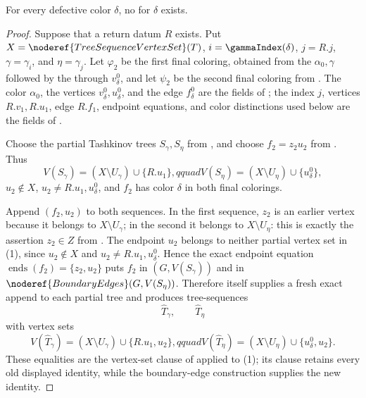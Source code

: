 \begin{helper}
For every defective color $\delta$, no
 for $\delta$ exists.
\end{helper}
\begin{proof}
Suppose that a return datum $R$ exists.  Put
$X=\noderef{TreeSequenceVertexSet}(T)$,
$i=\gammaIndex(\delta)$, $j=R.j$,
$\gamma=\gamma_i$, and $\eta=\gamma_j$.  Let
$\varphi_2$ be the first final coloring, obtained from the
$\alpha _0,\gamma$  followed by the
 through $v^0_\delta$, and let $\psi_2$
be the second final coloring from
.  The color $\alpha _0$,
the vertices $v^0_\delta,u^0_\delta$, and the edge $f^0_\delta$ are the
fields of ; the index $j$, vertices
$R.v_1,R.u_1$, edge $R.f_1$, endpoint equations, and color distinctions
used below are the fields of .

Choose the partial Tashkinov trees $S_\gamma,S_\eta$ from
, and choose
$f_2=z_2u_2$ from .  Thus
\[
 V(S_\gamma)=(X\setminus U_\gamma)\cup\{R.u_1\},qquad
 V(S_\eta)=(X\setminus U_\eta)\cup\{u^0_\delta\},             \tag{1}
\]
$u_2\notin X$, $u_2\ne R.u_1,u^0_\delta$, and $f_2$ has color
$\delta$ in both final colorings.

Append $(f_2,u_2)$ to both sequences.  In the first sequence, $z_2$ is
an earlier vertex because it belongs to
$X\setminus U_\gamma$; in the second it belongs to
$X\setminus U_\eta$: this is exactly the assertion $z_2\in Z$ from
.  The endpoint $u_2$ belongs
to neither partial vertex set in (1), since $u_2\notin X$ and
$u_2\ne R.u_1,u^0_\delta$.  Hence the exact endpoint equation
$\operatorname{ends}(f_2)=\{z_2,u_2\}$ puts $f_2$ in
$(G,V(S_\gamma))$ and in
$\noderef{BoundaryEdges}(G,V(S_\eta))$.  Therefore
 itself supplies a fresh
exact append to each partial tree and produces
tree-sequences
\[
 \widehat T_\gamma,\qquad \widehat T_\eta
\]
with vertex sets
\[
 V(\widehat T_\gamma)
   =(X\setminus U_\gamma)\cup\{R.u_1,u_2\},qquad
 V(\widehat T_\eta)
   =(X\setminus U_\eta)\cup\{u^0_\delta,u_2\}.                \tag{2}
\]
These equalities are the vertex-set clause of
 applied to (1); its
 clause retains every old displayed
identity, while the boundary-edge construction supplies the new identity.


\end{proof}
